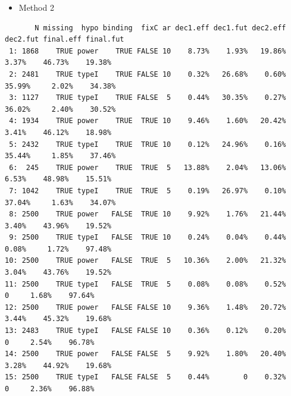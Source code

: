 \documentclass[12pt]{article}
\begin{document}
\begin{itemize}
\item Method 2
\end{itemize}
\begin{verbatim}
       N missing  hypo binding  fixC ar dec1.eff dec1.fut dec2.eff dec2.fut final.eff final.fut
 1: 1868    TRUE power    TRUE FALSE 10    8.73%    1.93%   19.86%    3.37%    46.73%    19.38%
 2: 2481    TRUE typeI    TRUE FALSE 10    0.32%   26.68%    0.60%   35.99%     2.02%    34.38%
 3: 1127    TRUE typeI    TRUE FALSE  5    0.44%   30.35%    0.27%   36.02%     2.40%    30.52%
 4: 1934    TRUE power    TRUE  TRUE 10    9.46%    1.60%   20.42%    3.41%    46.12%    18.98%
 5: 2432    TRUE typeI    TRUE  TRUE 10    0.12%   24.96%    0.16%   35.44%     1.85%    37.46%
 6:  245    TRUE power    TRUE  TRUE  5   13.88%    2.04%   13.06%    6.53%    48.98%    15.51%
 7: 1042    TRUE typeI    TRUE  TRUE  5    0.19%   26.97%    0.10%   37.04%     1.63%    34.07%
 8: 2500    TRUE power   FALSE  TRUE 10    9.92%    1.76%   21.44%    3.40%    43.96%    19.52%
 9: 2500    TRUE typeI   FALSE  TRUE 10    0.24%    0.04%    0.44%    0.08%     1.72%    97.48%
10: 2500    TRUE power   FALSE  TRUE  5   10.36%    2.00%   21.32%    3.04%    43.76%    19.52%
11: 2500    TRUE typeI   FALSE  TRUE  5    0.08%    0.08%    0.52%        0     1.68%    97.64%
12: 2500    TRUE power   FALSE FALSE 10    9.36%    1.48%   20.72%    3.44%    45.32%    19.68%
13: 2483    TRUE typeI   FALSE FALSE 10    0.36%    0.12%    0.20%        0     2.54%    96.78%
14: 2500    TRUE power   FALSE FALSE  5    9.92%    1.80%   20.40%    3.28%    44.92%    19.68%
15: 2500    TRUE typeI   FALSE FALSE  5    0.44%        0    0.32%        0     2.36%    96.88%
\end{verbatim}

\clearpage
\end{document}
